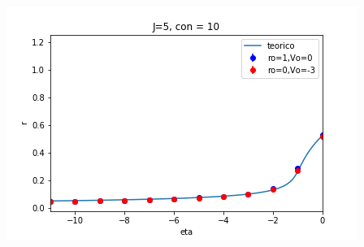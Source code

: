 \documentclass[a4paper]{article}
\begin{document}
\includegraphics[scale=0.7]{r_vs_eta_J5_con10.png}\\
\end{document}
